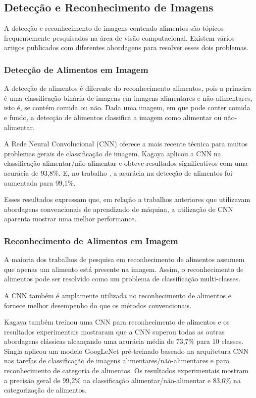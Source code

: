 \subsection{Detecção e Reconhecimento de Imagens}
A detecção e reconhecimento de imagens contendo alimentos são tópicos frequentemente pesquisados na área de visão computacional. Existem vários artigos publicados com diferentes abordagens para resolver esses dois problemas.  

\subsubsection{Detecção de Alimentos em Imagem}
A detecção de alimentos é diferente do reconhecimento alimentos, pois a primeira é uma classificação binária de imagens em imagens alimentares e não-alimentares, isto é, se contém comida ou não. Dada uma imagem, em que pode conter comida e fundo, a detecção de alimentos classifica a imagem como alimentar ou não-alimentar.

A Rede Neural Convolucional (CNN) oferece a mais recente técnica para muitos problemas gerais de classificação de imagem. Kagaya \cite{kagaya2014food} aplicou a CNN na classificação alimentar/não-alimentar e obteve resultados significativos com uma acurácia de 93,8\%. E, no trabalho \cite{kagaya2015highly}, a acurácia na detecção de alimentos foi aumentada para 99,1\%.

Esses resultados expressam que, em relação a trabalhos anteriores que utilizavam abordagens convencionais de aprendizado de máquina, a utilização de CNN aparenta mostrar uma melhor performance.

\subsubsection{Reconhecimento de Alimentos em Imagem}
A maioria dos trabalhos de pesquisa em reconhecimento de alimentos assumem que apenas um alimento está presente na imagem. Assim, o reconhecimento de alimentos pode ser resolvido como um problema de classificação multi-classes. 

A CNN também é amplamente utilizada no reconhecimento de alimentos e fornece melhor desempenho do que os métodos convencionais. 

Kagaya \cite{kagaya2014food} também treinou uma CNN para reconhecimento de alimentos e os resultados experimentais mostraram que a CNN superou todas as outras abordagens clássicas alcançando uma acurácia média de 73,7\% para 10 classes. Singla \cite{singla2016food} aplicou um modelo GoogLeNet pré-treinado baseado na arquitetura CNN nas tarefas de classificação de imagens alimentares/não-alimentares e para reconhecimento de categoria de alimentos. Os resultados experimentais mostram a precisão geral de 99,2\% na classificação alimentar/não-alimentar e 83,6\% na categorização de alimentos. 

